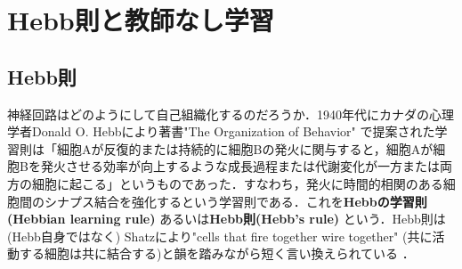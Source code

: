 \section{Hebb則と教師なし学習}
\subsection{Hebb則}
神経回路はどのようにして自己組織化するのだろうか．1940年代にカナダの心理学者Donald O. Hebbにより著書"The Organization of Behavior"\citep{Hebb1949-iv} で提案された学習則は「細胞Aが反復的または持続的に細胞Bの発火に関与すると，細胞Aが細胞Bを発火させる効率が向上するような成長過程または代謝変化が一方または両方の細胞に起こる」というものであった．すなわち，発火に時間的相関のある細胞間のシナプス結合を強化するという学習則である．これを\textbf{Hebbの学習則 (Hebbian learning rule)} あるいは\textbf{Hebb則(Hebb's rule)} という．Hebb則は (Hebb自身ではなく) Shatzにより"cells that fire together wire together" (共に活動する細胞は共に結合する)と韻を踏みながら短く言い換えられている \citep{Shatz1992-he}．

